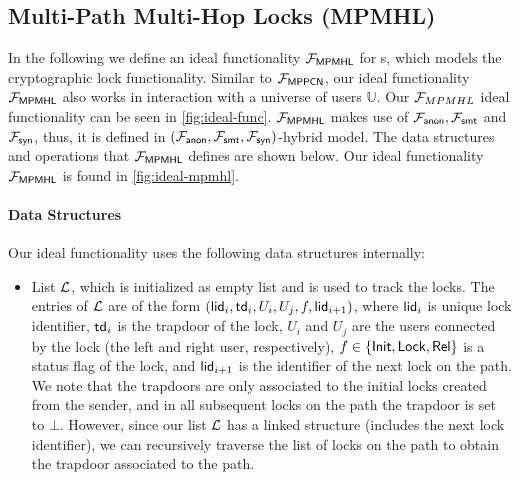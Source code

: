 \subsection{Multi-Path Multi-Hop Locks (MPMHL)}
\label{sec:mpmhl}

In the following we define an ideal functionality $\mathcal{F}_{\mathsf{MPMHL}}$ for {\sysname}s, which 
models the cryptographic lock functionality. Similar to $\mathcal{F}_{\mathsf{MPPCN}}$, our ideal 
functionality $\mathcal{F}_{\mathsf{MPMHL}}$ also works in interaction with a universe of users 
$\mathbb{U}$.  Our $\mathcal{F}_{MPMHL}$ ideal functionality can be seen in \cref{fig:ideal-func}.
$\mathcal{F}_{\mathsf{MPMHL}}$ makes use of $\mathcal{F}_{\mathsf{anon}}, \mathcal{F}_{\mathsf{smt}}$ and $\mathcal{F}_{\mathsf{syn}}$, thus, it is 
defined in $(\mathcal{F}_{\mathsf{anon}}, \mathcal{F}_{\mathsf{smt}}, \mathcal{F}_{\mathsf{syn}})$-hybrid model. The data structures and 
operations that $\mathcal{F}_{\mathsf{MPMHL}}$ defines are shown below. Our ideal functionality 
$\mathcal{F}_{\mathsf{MPMHL}}$ is found in \cref{fig:ideal-mpmhl}.

\paragraph{Data Structures}
Our ideal functionality uses the following data structures internally:

\begin{itemize}
	\item List $\mathcal{L}$, which is initialized as empty list and is used to track the locks. 
	The entries of $\mathcal{L}$ are of the form $(\mathsf{lid}_i, \mathsf{td}_i, U_i, U_j, f, \\ \mathsf{lid}_{i+1})$, 
	where $\mathsf{lid}_i$ is unique lock identifier, $\mathsf{td}_i$ is the trapdoor of the lock, $U_i$ 
	and $U_j$ are the users connected by the lock (the left and right user, respectively), 
	$f \in \{\mathsf{Init},\mathsf{Lock},\mathsf{Rel}\}$ is a status flag of the lock, and $\mathsf{lid}_{i+1}$ is the 
	identifier of the next lock on the path. We note that the trapdoors are only associated 
	to the initial locks created from the sender, and in all subsequent locks on the path the 
	trapdoor is set to $\bot$. However, since our list $\mathcal{L}$ has a linked structure (includes 
	the next lock identifier), we can recursively traverse the list of locks on the path to 
	obtain the trapdoor associated to the path.
\end{itemize}

